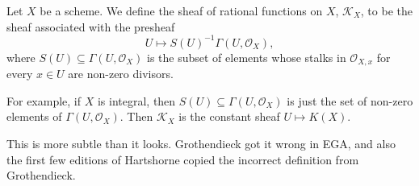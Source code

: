 Let $X$ be a scheme. We define the sheaf of rational functions on $X$, $\mathcal{K}_X$,
to be the sheaf associated with the presheaf
\[ U\mapsto S(U)^{-1}\Gamma(U, \mathcal{O}_X), \]
where $S(U) \subseteq \Gamma(U, \mathcal{O}_X)$ is the subset of elements whose stalks in
$\mathcal{O}_{X, x}$ for every $x \in U$ are non-zero divisors.

For example, if $X$ is integral, then $S(U) \subseteq \Gamma(U, \mathcal{O}_X)$
is just the set of non-zero elements of $\Gamma(U, \mathcal{O}_X)$.
Then $\mathcal{K}_X$ is the constant sheaf $U\mapsto K(X)$.

This is more subtle than it looks. Grothendieck got it wrong in EGA, and also the first
few editions of Hartshorne copied the incorrect definition from Grothendieck.
